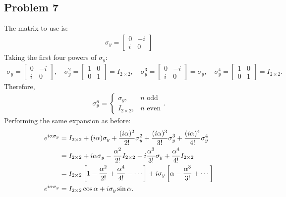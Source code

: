 \documentclass[letterpaper,11pt,twoside]{article}
\begin{document}
\subsection*{Problem 7}
The matrix to use is:
\begin{align*}
  \sigma_y=\begin{bmatrix}
    0&-i\\i&0
  \end{bmatrix}
\end{align*}
Taking the first four powers of $\sigma_y$:
\begin{align*}
\sigma_y=\begin{bmatrix}
  0&-i\\i&0
\end{bmatrix},\quad\sigma_y^2=\begin{bmatrix}
  1&0\\0&1
\end{bmatrix}=I_{2\times2},\quad\sigma_y^3=\begin{bmatrix}
  0&-i\\i&0
\end{bmatrix}=\sigma_y,\quad\sigma_y^4=\begin{bmatrix}
  1&0\\0&1
\end{bmatrix}=I_{2\times2}.
\end{align*}
Therefore,
\begin{align*}
  \sigma_y^n=\begin{cases}
    \sigma_y,&\text{$n$ odd}\\
    I_{2\times2},&\text{$n$ even}
  \end{cases}.
\end{align*}
Performing the same expansion as before:
\begin{align}
  e^{i\alpha\sigma_y}&=I_{2\times2}+(i\alpha)\sigma_y+\frac{(i\alpha)^2}{2!}\sigma_y^2+\frac{(i\alpha)^3}{3!}\sigma_y^3+\frac{(i\alpha)^4}{4!}\sigma_y^4\notag\\
  &=I_{2\times2}+i\alpha\sigma_y-\frac{\alpha^2}{2!}I_{2\times2}-i\frac{\alpha^3}{3!}\sigma_y+\frac{\alpha^4}{4!}I_{2\times2}\notag\\
  &=I_{2\times2}\left[1-\frac{\alpha^2}{2!}+\frac{\alpha^4}{4!}-\cdots\right]+i\sigma_y\left[\alpha-\frac{\alpha^3}{3!}+\cdots\right]\notag\\
  e^{i\alpha\sigma_y}&=I_{2\times2}\cos\alpha+i\sigma_y\sin\alpha.
\end{align}
\end{document}
